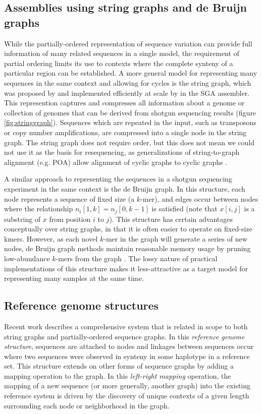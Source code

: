 \documentclass{article}
\begin{document}
\subsection{Assemblies using string graphs and de Bruijn graphs}

While the partially-ordered representation of sequence variation can provide full information of many related sequences in a single model, the requirement of partial ordering limits its use to contexts where the complete synteny of a particular region can be established. A more general model for representing many sequences in the same context and allowing for cycles is the string graph, which was proposed by \cite{myers2005} and implemented efficiently at scale by \cite{simpson2010} in the SGA assembler. This represention captures and compresses all information about a genome or collection of genomes that can be derived from shotgun sequencing results (figure \ref{fig:stringgraph}). Sequences which are repeated in the input, such as transposons or copy number amplifications, are compressed into a single node in the string graph. The string graph does not require order, but this does not mean we could not use it as the basis for resequencing, as generalizations of string-to-graph alignment (e.g. POA) allow alignment of cyclic graphs to cyclic graphs \cite{myers1989}.

A similar approach to representing the sequences in a shotgun sequencing experiment in the same context is the de Bruijn graph. In this structure, each node represents a sequence of fixed size (a $k$-mer), and edges occur between nodes where the relationship $n_i[1, k] = n_j[0, k-1]$ is satisfied (note that $x[i, j]$ is a substring of $x$ from position $i$ to $j$). This structure has certain advantages conceptually over string graphs, in that it is often easier to operate on fixed-size kmers. However, as each novel $k$-mer in the graph will generate a series of new nodes, de Bruijn graph methods maintain reasonable memory usage by pruning low-abundance $k$-mers from the graph \cite{iqbal2012}. The lossy nature of practical implementations of this structure makes it less-attractive as a target model for representing many samples at the same time.

\subsection{Reference genome structures}

Recent work \cite{paten2014mapping} describes a comprehensive system that is related in scope to both string graphs and partially-ordered sequence graphs. In this \emph{reference genome structure}, sequences are attached to nodes and linkages between sequences occur where two sequences were observed in synteny in some haplotype in a reference set. This structure extends on other forms of sequence graphs by adding a mapping operation to the graph. In this \emph{left-right mapping} operation, the mapping of a new sequence (or more generally, another graph) into the existing reference system is driven by the discovery of unique contexts of a given length surrounding each node or neighborhood in the graph.
\end{document}
